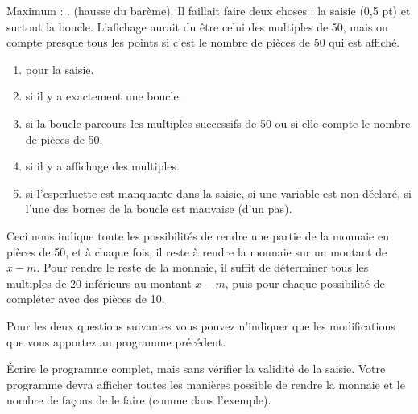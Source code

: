 \begin{baremeenv}
Maximum : . (hausse du barème).
Il faillait faire deux choses : la saisie (0,5 pt) et surtout la
boucle. L'afichage aurait du être celui des multiples de 50, mais on
compte presque tous les points si c'est le nombre de pièces de 50 qui est affiché.

  \begin{enumerate}[ (a)]
  \item {} pour la saisie.
  \item {} si il y a exactement une boucle.
\item {} si la boucle parcours les multiples successifs de 50
  ou si elle compte le nombre de pièces de 50. 
    \item {} si il y a affichage des multiples.
\item {} si l'esperluette
    est manquante dans la saisie, si une variable est non déclaré, si
    l'une des bornes de la boucle est mauvaise (d'un pas).
 \end{enumerate}
\end{baremeenv}

Ceci nous indique toute les possibilités de rendre une partie de la
monnaie en pièces de 50, et à chaque fois, il reste à rendre la
monnaie sur un montant de $x - m$. Pour rendre le reste de la monnaie,  il
suffit de déterminer tous les multiples de 20 inférieurs au
montant $x - m$, puis pour chaque possibilité de compléter avec des pièces de 10.

Pour les deux questions suivantes vous pouvez n'indiquer que les
modifications que vous apportez au programme précédent. 

\question Écrire le programme complet, mais sans vérifier la validité
de la saisie. Votre programme devra afficher toutes les manières
possible de rendre la monnaie et le nombre de façons de le faire (comme
dans l'exemple).

